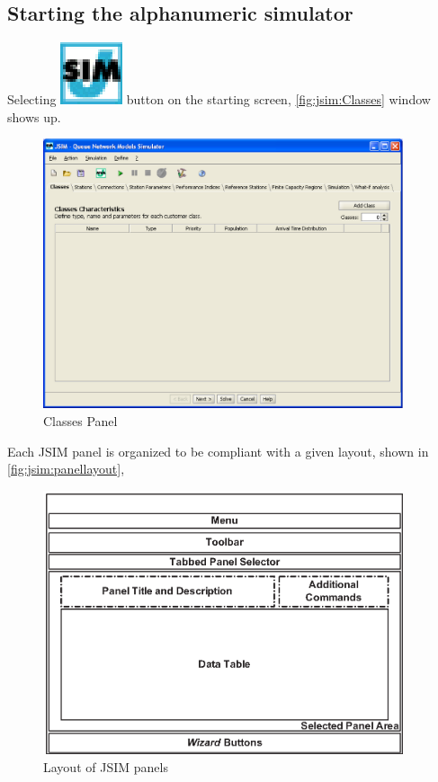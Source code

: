 \subsection{Starting the alphanumeric simulator}
Selecting \includegraphics[scale=.5]{img/JSIMIcon} button on the
starting screen, \autoref{fig:jsim:Classes} window shows up.
\begin{figure}[htb]
    \begin{center}
        \includegraphics[width=300pt]{img/jsim/classes}
    \end{center}
    \caption{Classes Panel}
    \label{fig:jsim:Classes}
\end{figure}
Each JSIM panel is organized to be compliant with a given layout, shown in \autoref{fig:jsim:panellayout}, 
\begin{figure}[tb]
    \begin{center}
        \includegraphics[width=300pt]{img/jsim/panelLayout}
    \end{center}
    \caption{Layout of JSIM panels}
    \label{fig:jsim:panellayout}
\end{figure}
